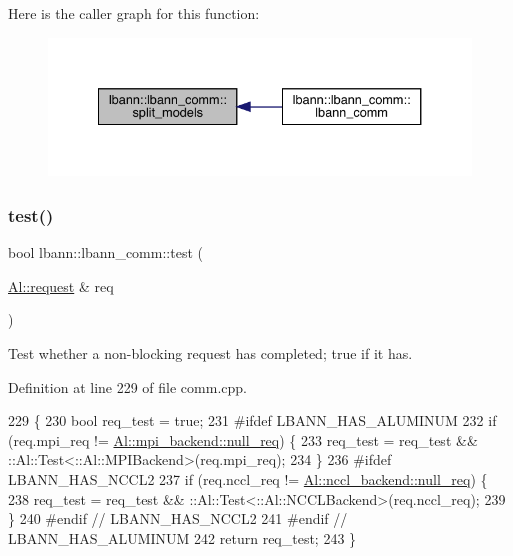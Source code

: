 Here is the caller graph for this function\+:\nopagebreak
\begin{figure}[H]
\begin{center}
\leavevmode
\includegraphics[width=334pt]{classlbann_1_1lbann__comm_a0ae02c4083623d2e1381336a73fdb379_icgraph}
\end{center}
\end{figure}
\mbox{\label{classlbann_1_1lbann__comm_a99303a11b939b4aba9d4a67dd0deef56}} 
\subsubsection{\texorpdfstring{test()}{test()}}
{\footnotesize\ttfamily bool lbann\+::lbann\+\_\+comm\+::test (\begin{DoxyParamCaption}\item[{\hyperlink{structlbann_1_1Al_1_1request}{Al\+::request} \&}]{req }\end{DoxyParamCaption})}

Test whether a non-\/blocking request has completed; true if it has. 

Definition at line 229 of file comm.\+cpp.


\begin{DoxyCode}
229                                     \{
230   \textcolor{keywordtype}{bool} req\_test = \textcolor{keyword}{true};
231 \textcolor{preprocessor}{#ifdef LBANN\_HAS\_ALUMINUM}
232   \textcolor{keywordflow}{if} (req.mpi\_req != \hyperlink{classlbann_1_1Al_1_1dummy__backend_a458ac4eb9f62b06984b4ef1b1eeb5851}{Al::mpi\_backend::null\_req}) \{
233     req\_test = req\_test && ::Al::Test<::Al::MPIBackend>(req.mpi\_req);
234   \}
236 \textcolor{preprocessor}{#ifdef LBANN\_HAS\_NCCL2}
237   \textcolor{keywordflow}{if} (req.nccl\_req != \hyperlink{classlbann_1_1Al_1_1dummy__backend_a458ac4eb9f62b06984b4ef1b1eeb5851}{Al::nccl\_backend::null\_req}) \{
238     req\_test = req\_test && ::Al::Test<::Al::NCCLBackend>(req.nccl\_req);
239   \}
240 \textcolor{preprocessor}{#endif // LBANN\_HAS\_NCCL2}
241 \textcolor{preprocessor}{#endif // LBANN\_HAS\_ALUMINUM}
242   \textcolor{keywordflow}{return} req\_test;
243 \}
\end{DoxyCode}
\mbox{\label{classlbann_1_1lbann__comm_a30439f28cf615e1406090799c5499321}} 
